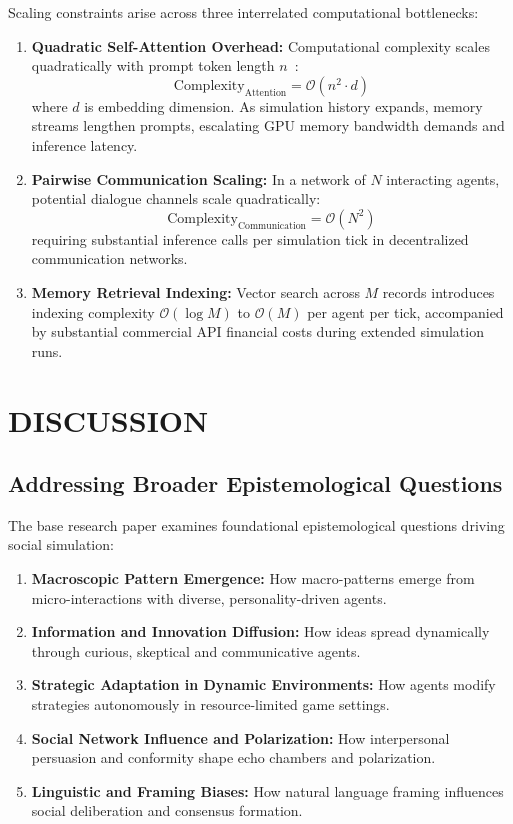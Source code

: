 \documentclass[12pt,a4paper]{report}
\begin{document}
Scaling constraints arise across three interrelated computational bottlenecks:
\begin{enumerate}[label=\arabic*.]
    \item \textbf{Quadratic Self-Attention Overhead:} Computational complexity scales quadratically with prompt token length $n$~\cite{vaswani2017attention}:
    \begin{equation}
    \text{Complexity}_{\text{Attention}} = \mathcal{O}(n^2 \cdot d)
    \end{equation}
    where $d$ is embedding dimension. As simulation history expands, memory streams lengthen prompts, escalating GPU memory bandwidth demands and inference latency.
    \item \textbf{Pairwise Communication Scaling:} In a network of $N$ interacting agents, potential dialogue channels scale quadratically:
    \begin{equation}
    \text{Complexity}_{\text{Communication}} = \mathcal{O}(N^2)
    \end{equation}
    requiring substantial inference calls per simulation tick in decentralized communication networks.
    \item \textbf{Memory Retrieval Indexing:} Vector search across $M$ records introduces indexing complexity $\mathcal{O}(\log M)$ to $\mathcal{O}(M)$ per agent per tick, accompanied by substantial commercial API financial costs during extended simulation runs.
\end{enumerate}

\chapter{DISCUSSION}
\label{chap:discussion}

\section{Addressing Broader Epistemological Questions}
\label{sec:epist_questions}

The base research paper examines foundational epistemological questions driving social simulation:
\begin{enumerate}[label=\arabic*.]
    \item \textbf{Macroscopic Pattern Emergence:} How macro-patterns emerge from micro-interactions with diverse, personality-driven agents.
    \item \textbf{Information and Innovation Diffusion:} How ideas spread dynamically through curious, skeptical and communicative agents.
    \item \textbf{Strategic Adaptation in Dynamic Environments:} How agents modify strategies autonomously in resource-limited game settings.
    \item \textbf{Social Network Influence and Polarization:} How interpersonal persuasion and conformity shape echo chambers and polarization.
    \item \textbf{Linguistic and Framing Biases:} How natural language framing influences social deliberation and consensus formation.
\end{enumerate}
\end{document}
